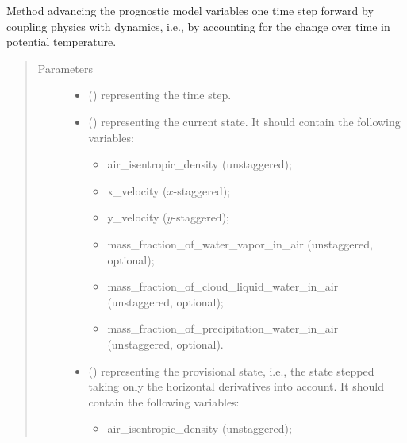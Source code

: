 \documentclass[letterpaper,10pt,english]{sphinxmanual}
\begin{document}
\begin{fulllineitems}
\begin{fulllineitems}
\label{\detokenize{api:dycore.prognostic_isentropic_nonconservative.PrognosticIsentropicNonconservative.step_coupling_physics_with_dynamics}}
Method advancing the prognostic model variables one time step forward by coupling physics with
dynamics, i.e., by accounting for the change over time in potential temperature.
\begin{quote}\begin{description}
\item[{Parameters}] \leavevmode\begin{itemize}
\item {} 
 () \textendash{}  representing the time step.

\item {} 
 () \textendash{} 
{\hyperref[\detokenize{api:storages.state_isentropic.StateIsentropic}]{}} representing the current state.
It should contain the following variables:
\begin{itemize}
\item {} 
air\_isentropic\_density (unstaggered);

\item {} 
x\_velocity (\(x\)-staggered);

\item {} 
y\_velocity (\(y\)-staggered);

\item {} 
mass\_fraction\_of\_water\_vapor\_in\_air (unstaggered, optional);

\item {} 
mass\_fraction\_of\_cloud\_liquid\_water\_in\_air (unstaggered, optional);

\item {} 
mass\_fraction\_of\_precipitation\_water\_in\_air (unstaggered, optional).

\end{itemize}


\item {} 
 () \textendash{} 
{\hyperref[\detokenize{api:storages.state_isentropic.StateIsentropic}]{}} representing the provisional state, i.e.,
the state stepped taking only the horizontal derivatives into account.
It should contain the following variables:
\begin{itemize}
\item {} 
air\_isentropic\_density (unstaggered);


\end{itemize}
\end{itemize}
\end{description}
\end{quote}
\end{fulllineitems}
\end{fulllineitems}
\end{document}
